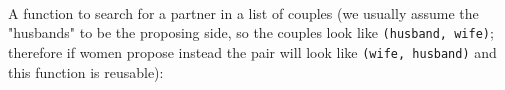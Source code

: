 {\begin{code}
\AgdaSpace{}%
\<%
\\
\>[0]\<%
\\
\>[0]\AgdaSpace{}%
\AgdaSymbol{|}\AgdaSpace{}%
\AgdaSpace{}%
\AgdaSymbol{\AgdaUnderscore{}}%
\>[15]\AgdaSymbol{=}\AgdaSpace{}%
\AgdaSpace{}%
\AgdaSymbol{(}\AgdaSpace{}%
\AgdaSymbol{)}\<%
\\
\>[0]\<%
\\
\>[0]\AgdaSpace{}%
\AgdaSymbol{|}\AgdaSpace{}%
\AgdaSymbol{\AgdaUnderscore{}}%
\>[15]\AgdaSymbol{=}\AgdaSpace{}%
\AgdaSpace{}%
\AgdaSpace{}%
\AgdaSpace{}%
\AgdaSymbol{(}\AgdaSpace{}%
\AgdaSymbol{(}\AgdaSpace{}%
\AgdaSymbol{))}\<%
\\
%
\\[\AgdaEmptyExtraSkip]%
\>[0]\AgdaSpace{}%
\AgdaSymbol{:}\AgdaSpace{}%
\AgdaSpace{}%
\AgdaSpace{}%
\AgdaSpace{}%
\AgdaSpace{}%
\AgdaSpace{}%
\AgdaSpace{}%
\<%
\\
\>[0]\AgdaSpace{}%
\AgdaSpace{}%
\AgdaSpace{}%
\AgdaSymbol{=}\AgdaSpace{}%
\AgdaSpace{}%
\AgdaSpace{}%
\AgdaSpace{}%
\<%
\\
\>[0]\<%
\end{code}

A function to search for a partner in a list of couples (we usually assume the "husbands" to be the proposing side, so the couples look like \texttt{(husband, wife)}; therefore if women propose instead the pair will look like \texttt{(wife, husband)} and this function is reusable):

}
